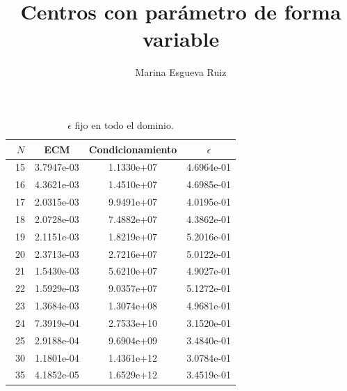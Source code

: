 \documentclass[11pt,a4paper]{article}
\author{Marina Esgueva Ruiz}
\title{Centros con parámetro de forma variable}
\begin{document}
\begin{table}
\caption{$\epsilon$ fijo en todo el dominio.}
\centering
\begin{tabular}{|c|c|c|c|}
\hline
\ $N$ & ECM & Condicionamiento & $\epsilon$ \\
\hline
\ 15 &  3.7947e-03& 1.1330e+07& 4.6964e-01\\
\ 16 & 4.3621e-03 & 1.4510e+07 & 4.6985e-01 \\
\ 17 & 2.0315e-03 & 9.9491e+07 & 4.0195e-01 \\
\ 18 &  2.0728e-03 & 7.4882e+07 &  4.3862e-01 \\
\ 19 & 2.1151e-03 & 1.8219e+07& 5.2016e-01 \\
\ 20 & 2.3713e-03 &  2.7216e+07&5.0122e-01 \\
\ 21 & 1.5430e-03 & 5.6210e+07 & 4.9027e-01 \\
\ 22 & 1.5929e-03 & 9.0357e+07 &  5.1272e-01 \\
\ 23 &  1.3684e-03 & 1.3074e+08 & 4.9681e-01 \\
\ 24 &  7.3919e-04 & 2.7533e+10 & 3.1520e-01 \\
\ 25 & 2.9188e-04 & 9.6904e+09 & 3.4840e-01 \\
\ 30 & 1.1801e-04 & 1.4361e+12 &  3.0784e-01 \\
\ 35 & 4.1852e-05 & 1.6529e+12 & 3.4519e-01 \\ 
\hline

\end{tabular}
\end{table}
\end{document}
